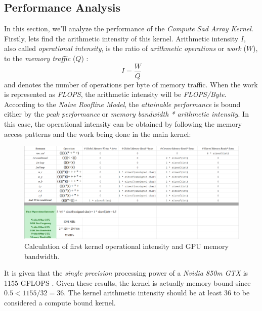 \subsection{Performance Analysis}
In this section, we'll analyze the performance of the \textit{Compute Sad Array Kernel}. Firstly, lets find the arithmetic intensity of this kernel. Arithmetic intensity $I$, also called \textit{operational intensity}, is the ratio of \textit{arithmetic operations} or \textit{work} ($W$), to the \textit{memory traffic} ($Q$) \cite{roofline}:
\begin{equation}
	I = \frac{W}{Q}
\end{equation}
and denotes the number of operations per byte of memory traffic. When the work is represented as \textit{FLOPS}, the arithmetic intensity will be \textit{FLOPS/Byte}. According to the \textit{Naive Roofline Model}, the \textit{attainable performance} is bound either by the \textit{peak performance} or \textit{memory bandwidth * arithmetic intensity}. In this case, the operational intensity can be obtained by following the memory access patterns and the work being done in the main kernel:
\begin{figure}[!h]\centering
	\includegraphics[width=1\textwidth]{intensity.PNG}
	\caption{Calculation of first kernel operational intensity and GPU memory bandwidth.}
	\label{pl1}
\end{figure}
It is given that the \textit{single precision} processing power of a \textit{Nvidia 850m GTX} is 1155 GFLOPS \cite{techpower}. Given these results, the kernel is actually memory bound since $0.5 < 1155 / 32 = 36$. The kernel arithmetic intensity should be at least 36 to be considered a compute bound kernel.

